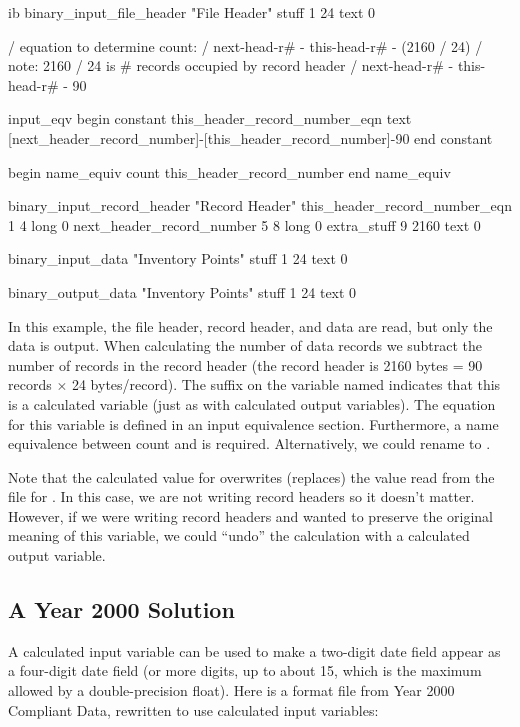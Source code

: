 \begin{vcode}{ib}
binary_input_file_header "File Header"
stuff 1 24 text 0

/ equation to determine count:
/ next-head-r# - this-head-r# - (2160 / 24) 
/ note: 2160 / 24 is # records occupied by record header
/ next-head-r# - this-head-r# - 90

input_eqv
begin constant
this_header_record_number_eqn text [next_header_record_number]-[this_header_record_number]-90
end constant

begin name_equiv
count this_header_record_number
end name_equiv

binary_input_record_header "Record Header"
this_header_record_number_eqn 1    4 long 0
next_header_record_number     5    8 long 0
extra_stuff                   9 2160 text 0

binary_input_data "Inventory Points"
stuff 1 24 text 0

binary_output_data "Inventory Points"
stuff 1 24 text 0
\end{vcode}

In this example, the file header, record header, and data are read,
but only the data is output.  When calculating the number of data
records we subtract the number of records in the record header (the
record header is 2160 bytes = 90 records $\times$ 24 bytes/record).
The  suffix on the variable named
 indicates that this is a calculated
variable (just as with calculated output variables).  The equation for
this variable is defined in an input equivalence section. Furthermore,
a name equivalence between count and
 is required.  Alternatively, we
could rename  to
.

Note that the calculated value for 
overwrites (replaces) the value read from the file for
.  In this case, we are not writing
record headers so it doesn't matter. However, if we were writing
record headers and wanted to preserve the original meaning of this
variable, we could ``undo'' the calculation with a calculated output
variable.

\subsection{A Year 2000 Solution}

A calculated input variable can be used to make a two-digit date field
appear as a four-digit date field (or more digits, up to about 15,
which is the maximum allowed by a double-precision float).  Here is a
format file from Year 2000 Compliant Data, rewritten to use calculated
input variables:

